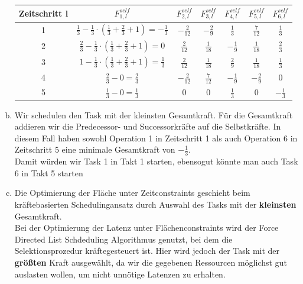 \documentclass[a4paper]{scrartcl}
\begin{document}
\begin{enumerate}[(a)]
	\begin{tabular}{|c|c|c|c|c|c|c|}
		\hline 
		Zeitschritt l& $F_{1,l}^{self}$ & $F_{2,l}^{self}$ & $F_{3,l}^{self}$ & $F_{4,l}^{self}$ & $F_{5,l}^{self}$ & $F_{6,l}^{self}$ \\ 
		\hline 
		1& $\frac{1}{3}-\frac{1}{3}\cdot(\frac{1}{3}+\frac{2}{3}+1)=-\frac{1}{3}$ & $-\frac{2}{12}$ & $-\frac{2}{9}$ & $\frac{1}{3}$ & $\frac{7}{12}$ & $\frac{1}{3}$ \\ 
		\hline 
		2& $\frac{2}{3}-\frac{1}{3}\cdot(\frac{1}{3}+\frac{2}{3}+1)=0$ & $\frac{2}{12}$ & $\frac{1}{18}$ & $-\frac{1}{9}$ & $\frac{1}{18}$ & $\frac{2}{3}$ \\ 
		\hline 
		3& $1-\frac{1}{3}\cdot(\frac{1}{3}+\frac{2}{3}+1)=\frac{1}{3}$ & $\frac{2}{12}$ & $\frac{1}{18}$ & $\frac{2}{9}$ & $\frac{1}{18}$ & $\frac{1}{3}$ \\ 
		\hline 
		4& $\frac{2}{3}-0=\frac{2}{3}$ & $-\frac{2}{12}$ & $\frac{7}{12}$ & $-\frac{1}{9}$ & $-\frac{2}{9}$ & 0 \\ 
		\hline 
		5& $\frac{1}{3}-0=\frac{1}{3}$ & 0 & 0 & $\frac{1}{3}$ & 0 & $-\frac{1}{3}$ \\ 
		\hline 
	\end{tabular} 
	\item Wir schedulen den Task mit der kleinsten Gesamtkraft. Für die Gesamtkraft addieren wir die Predecessor- und Successorkräfte auf die Selbstkräfte. In diesem Fall haben sowohl Operation 1 in Zeitschritt 1 als auch Operation 6 in Zeitschritt 5 eine minimale Gesamtkraft von $-\frac{1}{3}$.\\
	Damit würden wir Task 1 in Takt 1 starten, ebensogut könnte man auch Task 6 in Takt 5 starten
	\item Die Optimierung der Fläche unter Zeitconstraints geschieht beim kräftebasierten Schedulingansatz durch Auswahl des Tasks mit der \textbf{kleinsten} Gesamtkraft.\\
	Bei der Optimierung der Latenz unter Flächenconstraints wird der Force Directed List Schdeduling Algorithmus genutzt, bei dem die Selektionsprozedur kräftegesteuert ist. Hier wird jedoch der Task mit der \textbf{größten} Kraft ausgewählt, da wir die gegebenen Ressourcen möglichst gut auslasten wollen, um nicht unnötige Latenzen zu erhalten.
\end{enumerate}

	
\end{document}
